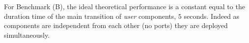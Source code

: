 


For Benchmark (B), the ideal theoretical performance is a constant equal to the duration time of the main transition of \emph{user} components, \ie $5$ seconds. Indeed as components are independent from each other (no ports) they are deployed simultaneously.


